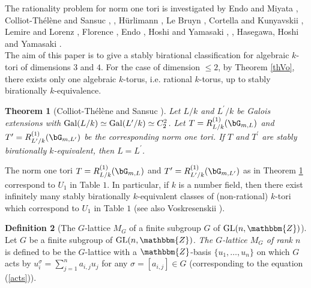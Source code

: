 \documentclass{amsart}
\theoremstyle{plain}
\newtheorem{theorem}{Theorem}[section]
\theoremstyle{definition}
\newtheorem{definition}[theorem]{Definition}
\theoremstyle{remark}
\newcommand{\bZ}{\mathbbm{Z}}\newcommand{\bQ}{\mathbbm{Q}}
\newcommand{\GL}{{\rm GL}}\newcommand{\SL}{{\rm SL}}
\newcounter{sub}\def\tr{\mbox{tr }}
\begin{document}
The rationality problem for norm one tori is investigated 
by Endo and Miyata \cite{EM75}, 
Colliot-Th\'{e}l\`{e}ne and Sansuc \cite{CTS77}, \cite{CTS87}, 
H\"{u}rlimann \cite{Hur84}, 
Le Bruyn \cite{LeB95}, 
Cortella and Kunyavskii \cite{CK00}, 
Lemire and Lorenz \cite{LL00}, 
Florence \cite{Flo}, 
Endo \cite{End11}, 
Hoshi and Yamasaki \cite{HY17}, 
\cite{HY21}, 
Hasegawa, Hoshi and Yamasaki \cite{HHY20}.\\
%

The aim of this paper is to give a stably 
birational classification for algebraic $k$-tori 
of dimensions $3$ and $4$. 
For the case of dimension $\leq 2$, by Theorem \ref{thVo}, 
there exists only one algebraic $k$-torus, 
i.e. rational $k$-torus, up to stably birationally $k$-equivalence. 

\begin{theorem}[Colliot-Th\'el\`ene and Sansuc {\cite[Corollaire, page 191]{CTS77}}]\label{thV4}
Let $L/k$ and $L^\prime/k$ be Galois extensions with 
${\rm Gal}(L/k)\simeq {\rm Gal}(L^\prime/k)\simeq C_2^2$. 
Let $T=R_{L/k}^{(1)}(\bG_{m,L})$ and 
$T^\prime=R_{L^\prime/k}^{(1)}(\bG_{m,L^\prime})$ 
be the corresponding norm one tori. 
If $T$ and $T^\prime$ are stably birationally $k$-equivalent, 
then %
$L=L^\prime$. 
\end{theorem}

The norm one tori $T=R_{L/k}^{(1)}(\bG_{m,L})$ 
and $T^\prime=R_{L^\prime/k}^{(1)}(\bG_{m,L^\prime})$ as in Theorem \ref{thV4} 
correspond to $U_1$ in Table $1$. 
In particular, if $k$ is a number field, then 
there exist infinitely many stably birationally $k$-equivalent classes of 
(non-rational) $k$-tori 
which correspond to $U_1$ in Table $1$ 
(see also Voskresenskii \cite[Example, page 14]{Vos70}). 

\begin{definition}[The $G$-lattice $M_G$ of a finite subgroup $G$ of 
$\GL(n,\bZ)$]\label{d2.2} 
Let $G$ be a finite subgroup of $\GL(n,\bZ)$. 
{\it The $G$-lattice $M_G$ of rank $n$} 
is defined to be the $G$-lattice with a $\bZ$-basis $\{u_1,\ldots,u_n\}$ 
on which $G$ acts by $u_i^{\sigma}=\sum_{j=1}^n a_{i,j}u_j$ for any $
\sigma=[a_{i,j}]\in G$ (corresponding to the equation (\ref{acts})). 
\end{definition}
\end{document}
